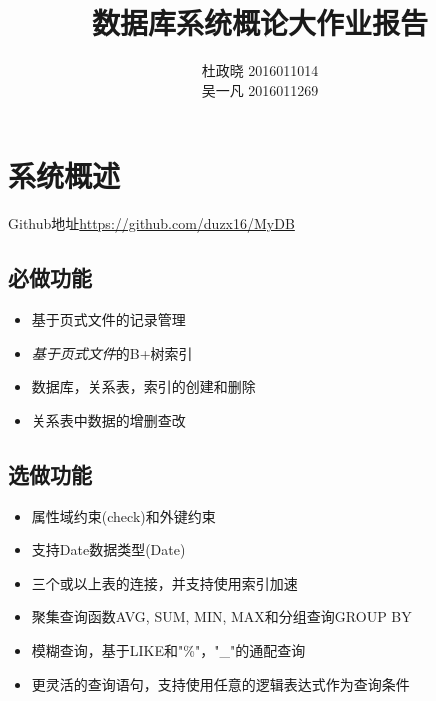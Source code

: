 \documentclass[11pt,UTF8]{report}
\title{数据库系统概论大作业报告}
\author{杜政晓 2016011014\\
吴一凡 2016011269}
\begin{document}
\maketitle

\section{系统概述}
Github地址\url{https://github.com/duzx16/MyDB}
\subsection{必做功能}
\begin{itemize}
	\item 基于页式文件的记录管理
	\item \emph{基于页式文件}的B+树索引
	\item 数据库，关系表，索引的创建和删除
	\item 关系表中数据的增删查改
\end{itemize}

\subsection{选做功能}
\begin{itemize}
	\item 属性域约束(check)和外键约束
	\item 支持Date数据类型(Date)
	\item 三个或以上表的连接，并支持使用索引加速
	\item 聚集查询函数AVG, SUM, MIN, MAX和分组查询GROUP BY
	\item 模糊查询，基于LIKE和"\%"，"\_"的通配查询
	\item 更灵活的查询语句，支持使用任意的逻辑表达式作为查询条件
\end{itemize}
\end{document}
